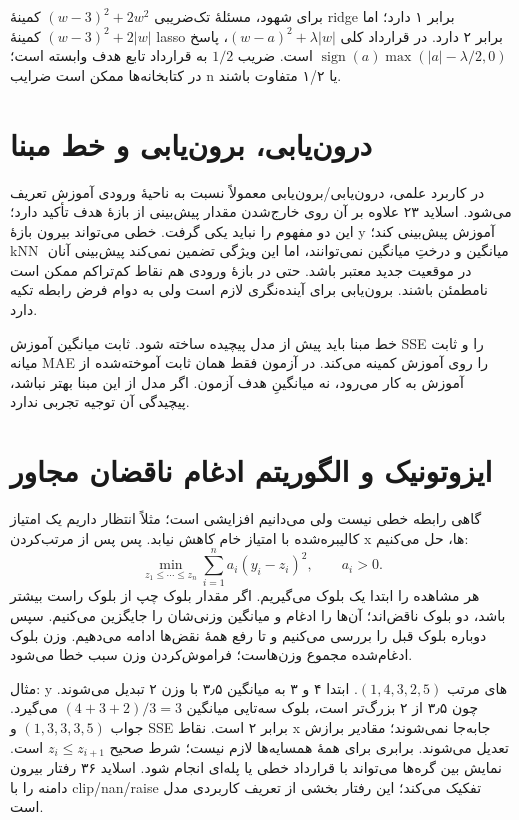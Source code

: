 برای شهود، مسئلهٔ تک‌ضریبی \((w-3)^2+2w^2\) کمینهٔ ridge برابر ۱ دارد؛ اما \((w-3)^2+2|w|\) کمینهٔ lasso برابر ۲ دارد. در قرارداد کلی \((w-a)^2+\lambda|w|\)، پاسخ \(\operatorname{sign}(a)\max(|a|-\lambda/2,0)\) است. ضریب \(1/2\) به قرارداد تابع هدف وابسته است؛ در کتابخانه‌ها ممکن است ضرایب n یا ۱/۲ متفاوت باشند.

\section{درون‌یابی، برون‌یابی و خط مبنا}

در کاربرد علمی، درون‌یابی/برون‌یابی معمولاً نسبت به ناحیهٔ ورودی آموزش تعریف می‌شود. اسلاید ۲۳ علاوه بر آن روی خارج‌شدن مقدار پیش‌بینی از بازهٔ هدف تأکید دارد؛ این دو مفهوم را نباید یکی گرفت. خطی می‌تواند بیرون بازهٔ y آموزش پیش‌بینی کند؛ kNN ِ میانگین و درختِ میانگین نمی‌توانند، اما این ویژگی تضمین نمی‌کند پیش‌بینی آنان در موقعیت جدید معتبر باشد. حتی در بازهٔ ورودی هم نقاط کم‌تراکم ممکن است نامطمئن باشند. برون‌یابی برای آینده‌نگری لازم است ولی به دوام فرض رابطه تکیه دارد.

خط مبنا باید پیش از مدل پیچیده ساخته شود. ثابت میانگین آموزش SSE را و ثابت میانه MAE را روی آموزش کمینه می‌کند. در آزمون فقط همان ثابت آموخته‌شده از آموزش به کار می‌رود، نه میانگینِ هدف آزمون. اگر مدل از این مبنا بهتر نباشد، پیچیدگی آن توجیه تجربی ندارد.

\section{ایزوتونیک و الگوریتم ادغام ناقضان مجاور}

گاهی رابطه خطی نیست ولی می‌دانیم افزایشی است؛ مثلاً انتظار داریم یک امتیاز کالیبره‌شده با امتیاز خام کاهش نیابد. پس پس از مرتب‌کردن x ها، حل می‌کنیم: \[
\min_{z_1\le\cdots\le z_n}\sum_{i=1}^n a_i(y_i-z_i)^2,\qquad a_i>0.
\] هر مشاهده را ابتدا یک بلوک می‌گیریم. اگر مقدار بلوک چپ از بلوک راست بیشتر باشد، دو بلوک ناقض‌اند؛ آن‌ها را ادغام و میانگین وزنی‌شان را جایگزین می‌کنیم. سپس دوباره بلوک قبل را بررسی می‌کنیم و تا رفع همهٔ نقض‌ها ادامه می‌دهیم. وزن بلوک ادغام‌شده مجموع وزن‌هاست؛ فراموش‌کردن وزن سبب خطا می‌شود.

مثال: y های مرتب \((1,4,3,2,5)\). ابتدا ۴ و ۳ به میانگین ۳٫۵ با وزن ۲ تبدیل می‌شوند. چون ۳٫۵ از ۲ بزرگ‌تر است، بلوک سه‌تایی میانگین \((4+3+2)/3=3\) می‌گیرد. جواب \((1,3,3,3,5)\) و SSE برابر ۲ است. نقاط x جابه‌جا نمی‌شوند؛ مقادیر برازش تعدیل می‌شوند. برابری برای همهٔ همسایه‌ها لازم نیست؛ شرط صحیح \(z_i\le z_{i+1}\) است. نمایش بین گره‌ها می‌تواند با قرارداد خطی یا پله‌ای انجام شود. اسلاید ۳۶ رفتار بیرون دامنه را با clip/nan/raise تفکیک می‌کند؛ این رفتار بخشی از تعریف کاربردی مدل است.

